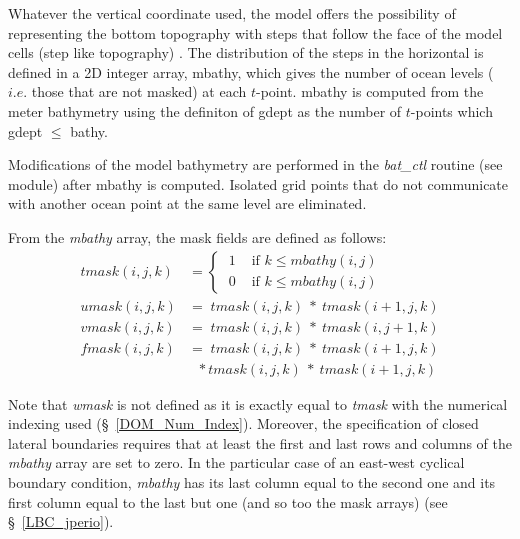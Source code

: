 {Whatever the vertical coordinate used, the model offers the possibility of 
representing the bottom topography with steps that follow the face of the 
model cells (step like topography) \citep{Madec_al_JPO96}. The distribution of 
the steps in the horizontal is defined in a 2D integer array, mbathy, which 
gives the number of ocean levels ($i.e.$ those that are not masked) at each 
$t$-point. mbathy is computed from the meter bathymetry using the definiton of 
gdept as the number of $t$-points which gdept $\leq$ bathy. 

Modifications of the model bathymetry are performed in the \textit{bat\_ctl} 
routine (see  module) after mbathy is computed. Isolated grid points 
that do not communicate with another ocean point at the same level are eliminated.

From the \textit{mbathy} array, the mask fields are defined as follows:
\begin{align*}
tmask(i,j,k) &= \begin{cases}   \; 1&   \text{ if $k\leq mbathy(i,j)$  }    \\
                                                \; 0&   \text{ if $k\leq mbathy(i,j)$  }    \end{cases}     \\
umask(i,j,k) &=         \; tmask(i,j,k) \ * \ tmask(i+1,j,k)	\\
vmask(i,j,k) &=         \; tmask(i,j,k) \ * \ tmask(i,j+1,k)	\\
fmask(i,j,k) &=         \; tmask(i,j,k) \ * \ tmask(i+1,j,k)	\\
                   & \ \ \, * tmask(i,j,k) \ * \ tmask(i+1,j,k)
\end{align*}

Note that \textit{wmask} is not defined as it is exactly equal to \textit{tmask} with 
the numerical indexing used (\S~\ref{DOM_Num_Index}). Moreover, the 
specification of closed lateral boundaries requires that at least the first and last 
rows and columns of the \textit{mbathy} array are set to zero. In the particular 
case of an east-west cyclical boundary condition, \textit{mbathy} has its last 
column equal to the second one and its first column equal to the last but one 
(and so too the mask arrays) (see \S~\ref{LBC_jperio}).


}
